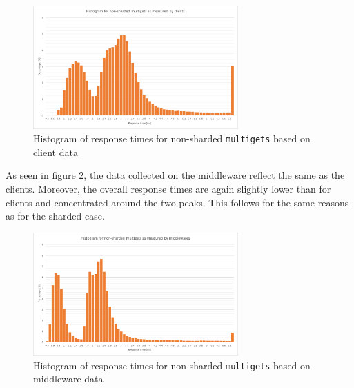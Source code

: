\documentclass[11pt,a4paper]{article}
\begin{document}
\begin{figure}[!h]
    \centering
    \includegraphics[width=0.7\textwidth]{processing/graphics/get_and_multigets_hist_non-sharded_clients.png}
    \caption{Histogram of response times for non-sharded \texttt{multigets} based on client data}
    \label{png::get_and_multigets_hist_non-sharded_clients}
\end{figure}

As seen in figure \ref{png::get_and_multigets_hist_non-sharded_mws}, the data collected on the middleware reflect the same as the clients. Moreover, the overall response times are again slightly lower than for clients and concentrated around the two peaks. This follows for the same reasons as for the sharded case.

\begin{figure}[!h]
    \centering
    \includegraphics[width=0.7\textwidth]{processing/graphics/get_and_multigets_hist_non-sharded_mws.png}
    \caption{Histogram of response times for non-sharded \texttt{multigets} based on middleware data}
    \label{png::get_and_multigets_hist_non-sharded_mws}
\end{figure}
\end{document}
